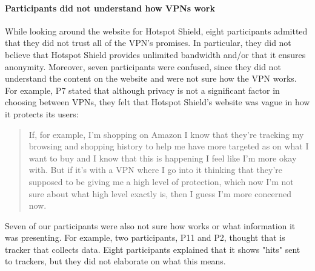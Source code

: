 % 


\paragraph{Participants did not understand how VPNs work}

While looking around the website for Hotspot Shield, eight participants admitted that they did not trust all of the VPN's promises. In particular, they did not believe
that Hotspot Shield provides unlimited bandwidth and/or that it ensures anonymity.
Moreover, seven participants were confused, since they did not understand the content
on the website and were not sure how the VPN works. For example, P7 stated that although privacy is not a significant factor in choosing between VPNs, they felt that Hotspot Shield's website was vague in how it protects its users:

\begin{quote}If, for example, I'm shopping on Amazon I know that they're tracking my browsing and shopping history to help me have more targeted as on what I want to buy and I know that this is happening I feel like I'm more okay with. But if it's with a VPN where I go into it thinking that they're supposed to be giving me a high level of protection, which now I'm not sure about what high level exactly is, then I guess I'm more concerned now.\end{quote}

Seven of our participants were also not sure how \tool works or what
information it was presenting. For example, two participants, P11 and P2,
thought that \tool is tracker that collects data. Eight participants
explained that it shows "hits" sent to trackers, but they did not elaborate on what this means.
